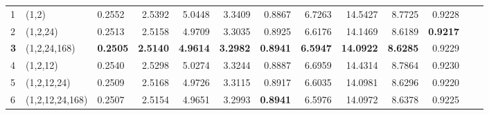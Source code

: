 \documentclass[alpha-refs]{wiley-article}
\begin{document}
\begin{table}[H]
\begin{tabular}{lllrrrrrrrrrr}
1 &  (1,2) & 0.2552 & 2.5392 & 5.0448 & 3.3409 & 0.8867 & 6.7263 & 14.5427 & 8.7725 & 0.9228 \\
2  & (1,2,24)& 0.2513 & 2.5158 & 4.9709 & 3.3035 & 0.8925 & 6.6176 & 14.1469 & 8.6189 & \textbf{0.9217} \\
\textbf{3}  & (1,2,24,168)&\textbf{0.2505} & \textbf{2.5140} & \textbf{4.9614} & \textbf{3.2982} & \textbf{0.8941} & \textbf{6.5947} & \textbf{14.0922} & \textbf{8.6285} &  0.9229 \\
4 &  (1,2,12) & 0.2540 & 2.5298 & 5.0274 & 3.3244 & 0.8887 & 6.6959 & 14.4314 & 8.7864 & 0.9230 \\
5  & (1,2,12,24)& 0.2509 & 2.5168 & 4.9726 & 3.3115 & 0.8917 & 6.6035 & 14.0981 & 8.6296 & 0.9220 \\
6  & (1,2,12,24,168)& 0.2507 & 2.5154 & 4.9651 & 3.2993 & \textbf{0.8941} & 6.5976 & 14.0972 & 8.6378 &  0.9225 \\

\end{tabular}
\end{table}
\end{document}
